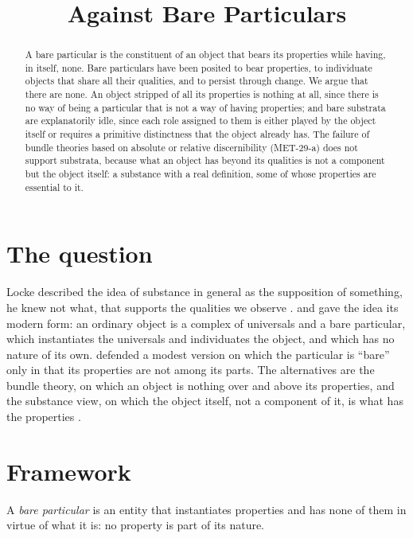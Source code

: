 \documentclass{situationist-preprint}
\title{Against Bare Particulars}
\begin{document}
\maketitle

\begin{abstract}
A bare particular is the constituent of an object that bears its properties while having, in itself, none. Bare particulars have been posited to bear properties, to individuate objects that share all their qualities, and to persist through change. We argue that there are none. An object stripped of all its properties is nothing at all, since there is no way of being a particular that is not a way of having properties; and bare substrata are explanatorily idle, since each role assigned to them is either played by the object itself or requires a primitive distinctness that the object already has. The failure of bundle theories based on absolute or relative discernibility (MET-29-a) does not support substrata, because what an object has beyond its qualities is not a component but the object itself: a substance with a real definition, some of whose properties are essential to it.
\end{abstract}

\section{The question}

Locke described the idea of substance in general as the supposition of something, he knew not what, that supports the qualities we observe \citep[II.xxiii.2]{LockeEssay}. \citet{Bergmann1967} and \citet{Allaire1963} gave the idea its modern form: an ordinary object is a complex of universals and a bare particular, which instantiates the universals and individuates the object, and which has no nature of its own. \citet{Sider2006} defended a modest version on which the particular is \enquote{bare} only in that its properties are not among its parts. The alternatives are the bundle theory, on which an object is nothing over and above its properties, and the substance view, on which the object itself, not a component of it, is what has the properties \citep{Loux1978,Lowe2006}.

\section{Framework}

\begin{definition}\label{d:bare}
A \emph{bare particular} is an entity that instantiates properties and has none of them in virtue of what it is: no property is part of its nature.
\end{definition}
\end{document}
